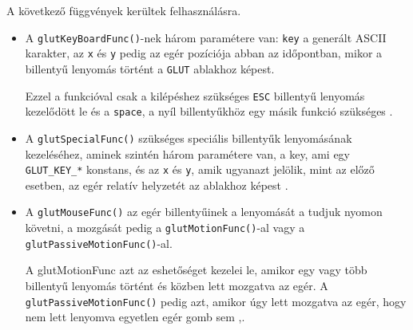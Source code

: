 A következő függvények kerültek felhasználásra.
\begin{itemize}
\item A \texttt{glutKeyBoardFunc()}-nek három paramétere van: \texttt{key} a generált ASCII karakter, az \texttt{x} és \texttt{y} pedig az egér pozíciója abban az időpontban, mikor a billentyű lenyomás történt a \texttt{GLUT} ablakhoz képest.

Ezzel a funkcióval csak a kilépéshez szükséges \texttt{ESC} billentyű lenyomás kezelődött le és a \texttt{space}, a nyíl billentyűkhöz egy másik funkció szükséges \cite{keyboardfunc}.
\item A \texttt{glutSpecialFunc()} szükséges speciális billentyűk lenyomásának kezeléséhez,  
aminek szintén három paramétere van, a key, ami egy \texttt{GLUT\_KEY\_*} konstans, és az \texttt{x} és \texttt{y}, amik ugyanazt jelölik, mint az előző esetben, az egér relatív helyzetét az ablakhoz képest \cite{keyboardspec}.
\item A \texttt{glutMouseFunc()} az egér billentyűinek a lenyomását a  tudjuk nyomon követni, a mozgását pedig a \texttt{glutMotionFunc()}-al vagy a \texttt{glutPassiveMotionFunc()}-al. 

A glutMotionFunc azt az eshetőséget kezelei le, amikor egy vagy több billentyű lenyomás történt és közben lett mozgatva az egér. A \texttt{glutPassiveMotionFunc()} pedig azt, amikor úgy lett mozgatva az egér, hogy nem lett lenyomva egyetlen egér gomb sem \cite{mousemot},\cite{mousefunc}.
\end{itemize}
